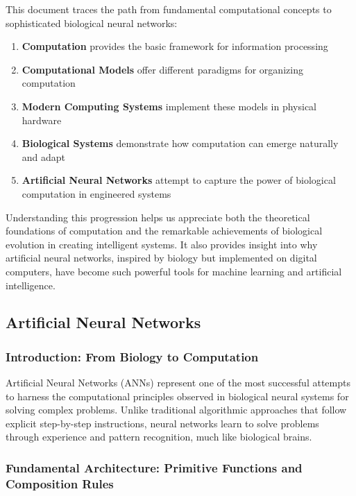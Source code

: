 This document traces the path from fundamental computational concepts to sophisticated biological neural networks:

\begin{enumerate}
\item \textbf{Computation} provides the basic framework for information processing
\item \textbf{Computational Models} offer different paradigms for organizing computation
\item \textbf{Modern Computing Systems} implement these models in physical hardware
\item \textbf{Biological Systems} demonstrate how computation can emerge naturally and adapt
\item \textbf{Artificial Neural Networks} attempt to capture the power of biological computation in engineered systems
\end{enumerate}

Understanding this progression helps us appreciate both the theoretical foundations of computation and the remarkable achievements of biological evolution in creating intelligent systems. It also provides insight into why artificial neural networks, inspired by biology but implemented on digital computers, have become such powerful tools for machine learning and artificial intelligence.

\subsection{Artificial Neural Networks}

\subsubsection{Introduction: From Biology to Computation}

Artificial Neural Networks (ANNs) represent one of the most successful attempts to harness the computational principles observed in biological neural systems for solving complex problems. Unlike traditional algorithmic approaches that follow explicit step-by-step instructions, neural networks learn to solve problems through experience and pattern recognition, much like biological brains.

\subsubsection{Fundamental Architecture: Primitive Functions and Composition Rules}

